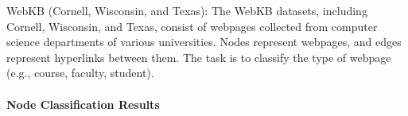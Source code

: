 WebKB (Cornell, Wisconsin, and Texas): The WebKB datasets, including Cornell, Wisconsin, and Texas, consist of webpages collected from computer science departments of various universities. Nodes represent webpages, and edges represent hyperlinks between them. The task is to classify the type of webpage (e.g., course, faculty, student)\cite{peixoto2019network}.




\begin{table}[h!]
\renewcommand{\arraystretch}{.5}
\centering
{}
\caption{Summary of datasets and their characteristics.}
\label{tab:datasets}
\end{table}



\paragraph{Node Classification Results}

